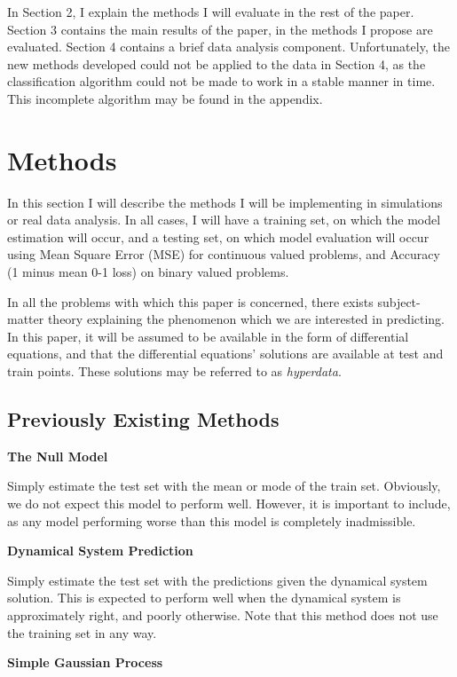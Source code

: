 \documentclass{article}
\begin{document}
	In Section 2, I explain the methods I will evaluate in the rest of the paper. Section 3 contains the main results of the paper, in the methods I propose are evaluated. Section 4 contains a brief data analysis component. Unfortunately, the new methods developed could not be applied to the data in Section 4, as the classification algorithm could not be made to work in a stable manner in time. This incomplete algorithm may be found in the appendix.
	
	\section{Methods}
	
	In this section I will describe the methods I will be implementing in simulations or real data analysis. In all cases, I will have a training set, on which the model estimation will occur, and a testing set, on which model evaluation will occur using Mean Square Error (MSE) for continuous valued problems, and Accuracy (1 minus mean 0-1 loss) on binary valued problems.
	
	In all the problems with which this paper is concerned, there exists subject-matter theory explaining the phenomenon which we are interested in predicting. In this paper, it will be assumed to be available in the form of differential equations, and that the differential equations' solutions are available at test and train points. These solutions may be referred to as \textit{hyperdata}.
	
	\subsection{Previously Existing Methods}
	
	\textbf{The Null Model}
	
	Simply estimate the test set with the mean or mode of the train set. Obviously, we do not expect this model to perform well. However, it is important to include, as any model performing worse than this model is completely inadmissible.
	
	\textbf{Dynamical System Prediction}
	
	Simply estimate the test set with the predictions given the dynamical system solution. This is expected to perform well when the dynamical system is approximately right, and poorly otherwise. Note that this method does not use the training set in any way.
	
	\textbf{Simple Gaussian Process}
	
\end{document}
